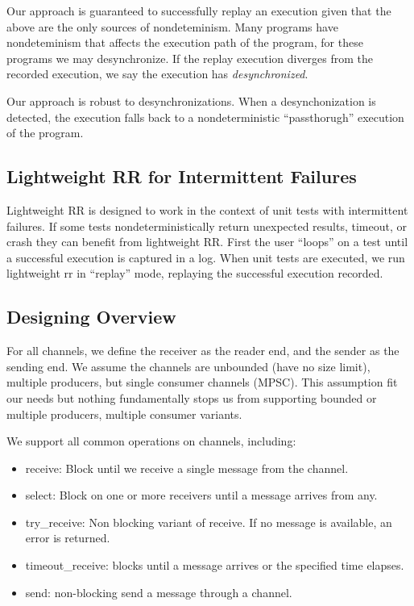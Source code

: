 \documentclass{article}
\begin{document}
Our approach is guaranteed to successfully replay an execution given that the above are the only sources of nondeteminism. Many programs have nondeteminism that affects the execution path of the program, for these programs we may desynchronize. If the replay execution diverges from the recorded execution, we say the execution has \textit{desynchronized}.

Our approach is robust to desynchronizations. When a desynchonization is detected, the execution falls back to a nondeterministic ``passthorugh'' execution of the program.
\subsection{Lightweight RR for Intermittent Failures}
Lightweight RR is designed to work in the context of unit tests with intermittent failures.
If some tests nondeterministically return unexpected results, timeout, or crash they can
benefit from lightweight RR. First the user ``loops'' on a test until a successful
execution is captured in a log. When unit tests are executed, we run lightweight rr in
``replay'' mode, replaying the successful execution recorded.

\subsection{Designing Overview}
For all channels, we define the receiver as the reader end, and the sender as the sending end. We assume the channels are unbounded (have no size limit), multiple producers, but single consumer channels (MPSC). This assumption fit our needs but nothing fundamentally stops us from supporting bounded or multiple producers, multiple consumer variants.

We support all common operations on channels, including:
\begin{itemize}
\item receive: Block until we receive a single message from the channel.
\item select: Block on one or more receivers until a message arrives from any.
\item try\_receive: Non blocking variant of receive. If no message is available, an
  error is returned.
\item timeout\_receive: blocks until a message arrives or the specified time elapses.
\item send: non-blocking send a message through a channel.
\end{itemize}
\end{document}

